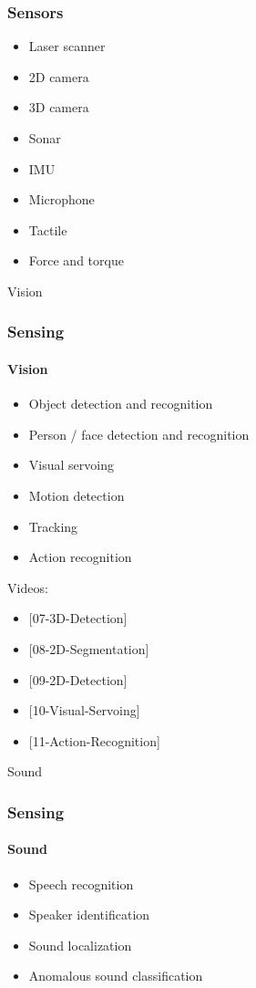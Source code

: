 \documentclass{beamer}
\begin{document}
\begin{frame}
\frametitle{Sensors}
\begin{itemize}
    \item Laser scanner
    \item 2D camera
    \item 3D camera
    \item Sonar
    \item IMU
    \item Microphone
    \item Tactile
    \item Force and torque
\end{itemize}
\end{frame}

\begin{frame}[standout]
     Vision
\end{frame}
\begin{frame}
\frametitle{Sensing}
\framesubtitle{Vision}
\begin{itemize}
    \item <1->Object detection and recognition
    \item <2->Person / face detection and recognition
    \item <3->Visual servoing
    \item <4->Motion detection
    \item <5->Tracking
    \item <6->Action recognition
\end{itemize}

{\footnotesize
Videos:
\begin{itemize}
\item <1->{[07-3D-Detection]}
\item <1->{[08-2D-Segmentation]}
\item <1->{[09-2D-Detection]}
\item <3->{[10-Visual-Servoing]}
\item <6->{[11-Action-Recognition]}
\end{itemize}}
\end{frame}

\begin{frame}[standout]
     Sound
\end{frame}
\begin{frame}
\frametitle{Sensing}
\framesubtitle{Sound}
\begin{itemize}
    \item <1->Speech recognition
    \item <2->Speaker identification
    \item <3->Sound localization
    \item <4->Anomalous sound classification
\end{itemize}
\end{frame}
\end{document}
